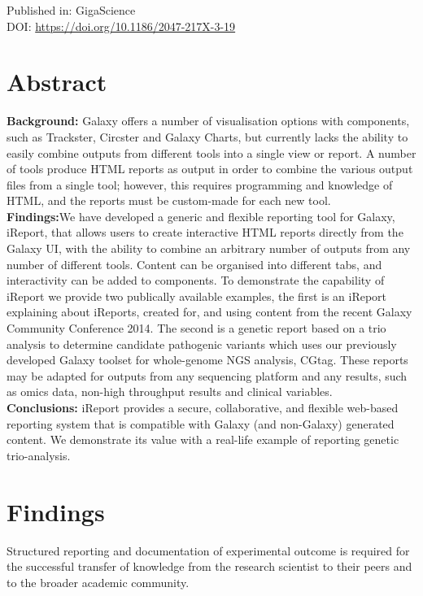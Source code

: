 Published in: GigaScience \\
DOI: \url{https://doi.org/10.1186/2047-217X-3-19} \\

\section*{Abstract}

\textbf{Background:} Galaxy offers a number of visualisation options with components, such as Trackster, Circster and Galaxy Charts, but currently lacks the ability to easily combine outputs from different tools into a single view or report. A number of tools produce HTML reports as output in order to combine the various output files from a single tool; however, this requires programming and knowledge of HTML, and the reports must be custom-made for each new tool.\\
\textbf{Findings:}We have developed a generic and flexible reporting tool for Galaxy, iReport, that allows users to create interactive HTML reports directly from the Galaxy UI, with the ability to combine an arbitrary number of outputs from any number of different tools. Content can be organised into different tabs, and interactivity can be added to components. To demonstrate the capability of iReport we provide two publically available examples, the first is an iReport explaining about iReports, created for, and using content from the recent Galaxy Community Conference 2014. The second is a genetic report based on a trio analysis to determine candidate pathogenic variants which uses our previously developed Galaxy toolset for whole-genome NGS analysis, CGtag. These reports may be adapted for outputs from any sequencing platform and any results, such as omics data, non-high throughput results and clinical variables.\\
\textbf{Conclusions:} iReport provides a secure, collaborative, and flexible web-based reporting system that is compatible with Galaxy (and non-Galaxy) generated content. We demonstrate its value with a real-life example of reporting genetic trio-analysis.


\section*{Findings}

Structured reporting and documentation of experimental outcome is required for the successful transfer of knowledge from the research scientist to their peers and to the broader academic community.

